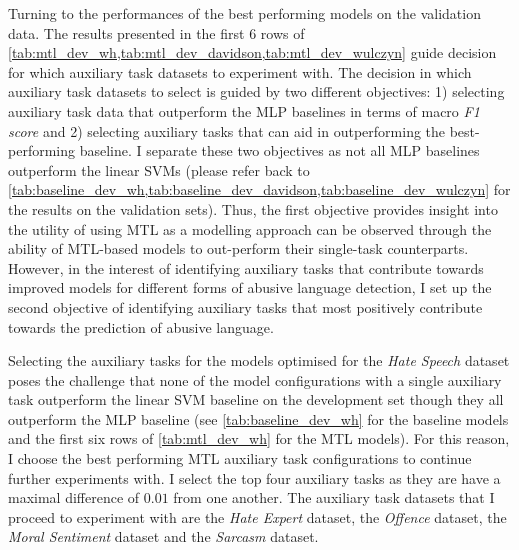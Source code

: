 Turning to the performances of the best performing models on the validation data.
The results presented in the first 6 rows of \cref{tab:mtl_dev_wh,tab:mtl_dev_davidson,tab:mtl_dev_wulczyn} guide decision for which auxiliary task datasets to experiment with.
The decision in which auxiliary task datasets to select is guided by two different objectives: 1) selecting auxiliary task data that outperform the MLP baselines in terms of macro \textit{F1 score} and 2) selecting auxiliary tasks that can aid in outperforming the best-performing baseline.
I separate these two objectives as not all MLP baselines outperform the linear SVMs (please refer back to \cref{tab:baseline_dev_wh,tab:baseline_dev_davidson,tab:baseline_dev_wulczyn} for the results on the validation sets).
Thus, the first objective provides insight into the utility of using MTL as a modelling approach can be observed through the ability of MTL-based models to out-perform their single-task counterparts.
However, in the interest of identifying auxiliary tasks that contribute towards improved models for different forms of abusive language detection, I set up the second objective of identifying auxiliary tasks that most positively contribute towards the prediction of abusive language.

Selecting the auxiliary tasks for the models optimised for the \textit{Hate Speech} dataset poses the challenge that none of the model configurations with a single auxiliary task outperform the linear SVM baseline on the development set though they all outperform the MLP baseline (see \cref{tab:baseline_dev_wh} for the baseline models and the first six rows of \cref{tab:mtl_dev_wh} for the MTL models).
For this reason, I choose the best performing MTL auxiliary task configurations to continue further experiments with.
I select the top four auxiliary tasks as they are have a maximal difference of $0.01$ from one another.
The auxiliary task datasets that I proceed to experiment with are the \textit{Hate Expert} dataset, the \textit{Offence} dataset, the \textit{Moral Sentiment} dataset and the \textit{Sarcasm} dataset.

